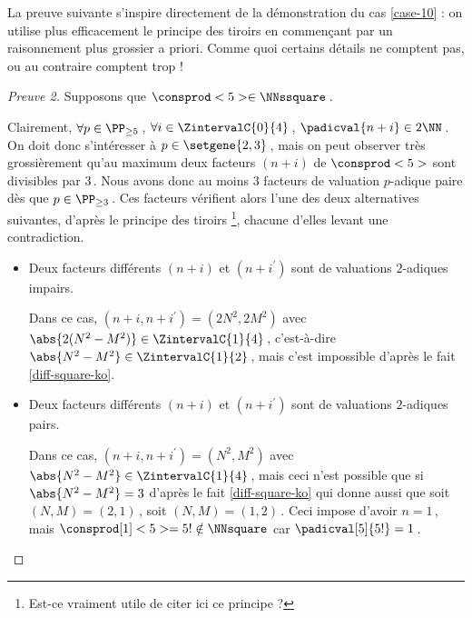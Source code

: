 

La preuve suivante s'inspire directement de la démonstration du cas \ref{case-10} : on utilise plus efficacement le principe des tiroirs en commençant par un raisonnement plus grossier a priori. Comme quoi certains détails ne comptent pas, ou au contraire comptent trop !

\begin{proof}[Preuve 2]%
    Supposons que $\consprod<5> \in \NNssquare$\,.
    
    \smallskip
    
    Clairement, 
    $\forall p \in \PP_{\geq 5}$\,, 
    $\forall i \in \ZintervalC{0}{4}$\,, 
    $\padicval{n + i} \in 2 \NN$\,.
    On doit donc s'intéresser à $p \in \setgene{2, 3}$\,, mais on peut observer très grossièrement qu'au maximum deux facteurs $(n + i)$ de $\consprod<5>$ sont divisibles par $3$\,.
    Nous avons donc au moins $3$ facteurs de valuation $p$-adique paire dès que $p \in \PP_{\geq 3}$\,.
    Ces facteurs vérifient alors l'une des deux alternatives suivantes, d'après le principe des tiroirs
    \footnote{
    	Est-ce vraiment utile de citer ici ce principe ?
    },
    chacune d'elles levant une contradiction.
    \begin{itemize}
    	\medskip
		\item Deux facteurs différents $(n+i)$ et $(n+i^\prime)$ sont de valuations $2$-adiques impairs.
		
		\smallskip
		\noindent
		Dans ce cas, $(n+i, n+i^\prime) = (2 N^2, 2 M^2)$ avec $\abs{2(N^2 - M^2)} \in \ZintervalC{1}{4}$\,, c'est-à-dire $\abs{N^2 - M^2} \in \ZintervalC{1}{2}$\,, mais c'est impossible d'après le fait \ref{diff-square-ko}.


    	\medskip
		\item Deux facteurs différents $(n+i)$ et $(n+i^\prime)$ sont de valuations $2$-adiques pairs.
		
		\smallskip
		\noindent
		Dans ce cas, $(n+i, n+i^\prime) = (N^2, M^2)$ avec $\abs{N^2 - M^2} \in \ZintervalC{1}{4}$\,, mais ceci n'est possible que si $\abs{N^2 - M^2} = 3$ d'après le fait \ref{diff-square-ko} qui donne aussi que soit $(N, M) = (2, 1)$\,, soit $(N, M) = (1, 2)$\,.
		Ceci impose d'avoir $n = 1$\,, mais $\consprod[1]<5> = 5! \notin \NNsquare$ car $\padicval[5]{5!} = 1$\,.
		\qedhere
    \end{itemize}
\end{proof}




